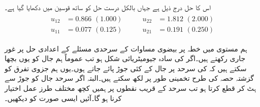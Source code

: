اس کا حل درج ذیل ہے جہاں بالکل درست حل کو ساتھ قوسین میں دکھایا گیا ہے۔
\begin{gather*}
\begin{aligned}
u_{12}&=0.866\,\,(1.000)\\
u_{11}&=0.077\,\,(0.125)
\end{aligned}\quad\quad
\begin{aligned}
u_{22}&=1.812\,\,(2.000)\\
u_{21}&=0.191\,\,(0.250)
\end{aligned}
\end{gather*}

ہم  مستوی میں خطہ  پر بیضوی مساوات کے سرحدی مسئلے کے اعدادی حل پر غور جاری رکھتے ہیں۔اگر  کی سادہ جیومیٹریائی شکل ہو تب عموماً ہم جال کو یوں بچھا سکتے ہیں کہ  کی سرحد  پر جال کے کئی جوڑ پائے جاتے ہوں۔یوں ہم جزوی تفرق کو گزشتہ حصہ کی طرح تخمینی طور پر لکھ سکتے ہیں۔البتہ اگر سرحد  جال کو جوڑ سے ہٹ کر قطع کرتا ہو تب سرحد کے قریب نقطوں پر ہمیں کچھ مختلف طرز عمل اختیار کرنا ہو گا۔آئیں ایسی صورت کو دیکھیں۔

